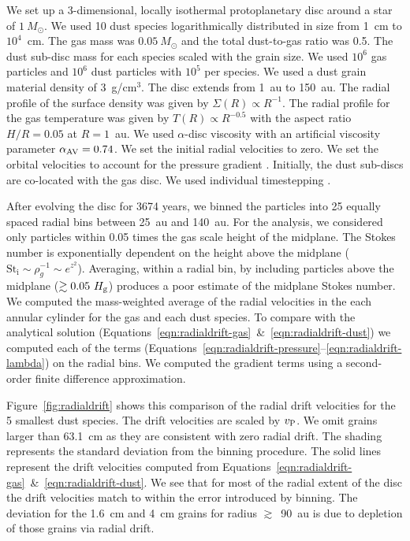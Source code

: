 \documentclass[fleqn,usenatbib]{mnras}
\begin{document}
We set up a 3-dimensional, locally isothermal protoplanetary disc around a star
of \(1~M_{\odot}\). We used 10 dust species logarithmically distributed in size
from 1~cm to \(10^4\)~cm. The gas mass was \(0.05~M_{\odot}\) and the total
dust-to-gas ratio was 0.5. The dust sub-disc mass for each species scaled with
the grain size. We used \(10^6\) gas particles and \(10^6\) dust particles with
\(10^5\) per species. We used a dust grain material density of 3~g/cm\({}^3\).
The disc extends from 1~au to 150~au. The radial profile of the surface density
was given by \(\Sigma(R) \propto R^{-1}\). The radial profile for the gas
temperature was given by \(T(R) \propto R^{-0.5}\) with the aspect ratio \(H/R =
0.05\) at \(R=1\)~au. We used \(\alpha\)-disc viscosity
\citep[Section~3.3.4]{Price2018PASA...35...31P} with an artificial viscosity
parameter \(\alpha_{\rm AV}=0.74\). We set the initial radial velocities to
zero. We set the orbital velocities to account for the pressure gradient
\citep[Section~3.3.2]{Price2018PASA...35...31P}. Initially, the dust sub-discs
are co-located with the gas disc. We used individual timestepping
\citep[Section~2.3.4]{Price2018PASA...35...31P}.

After evolving the disc for 3674 years, we binned the particles into 25 equally
spaced radial bins between 25~au and 140~au. For the analysis, we considered
only particles within 0.05 times the gas scale height of the midplane. The
Stokes number is exponentially dependent on the height above the midplane
(\(\mathrm{St_i} \sim \rho_g^{-1} \sim e^{z^2}\)). Averaging, within a radial
bin, by including particles above the midplane (\(\gtrsim 0.05\ H_{\rm g}\))
produces a poor estimate of the midplane Stokes number. We computed the
mass-weighted average of the radial velocities in the each annular cylinder for
the gas and each dust species. To compare with the analytical solution
(Equations~\ref{eqn:radialdrift-gas}~\&~\ref{eqn:radialdrift-dust}) we computed
each of the terms
(Equations~\ref{eqn:radialdrift-pressure}--\ref{eqn:radialdrift-lambda}) on the
radial bins. We computed the gradient terms using a second-order finite
difference approximation.

Figure~\ref{fig:radialdrift} shows this comparison of the radial drift
velocities for the 5 smallest dust species. The drift velocities are scaled by
\(v_{\rm P}\). We omit grains larger than 63.1~cm as they are consistent with
zero radial drift. The shading represents the standard deviation from the
binning procedure. The solid lines represent the drift velocities computed from
Equations~\ref{eqn:radialdrift-gas}~\&~\ref{eqn:radialdrift-dust}. We see that
for most of the radial extent of the disc the drift velocities match to within
the error introduced by binning. The deviation for the 1.6~cm and 4~cm grains
for radius \(\gtrsim\)~90~au is due to depletion of those grains via radial
drift.
\end{document}
